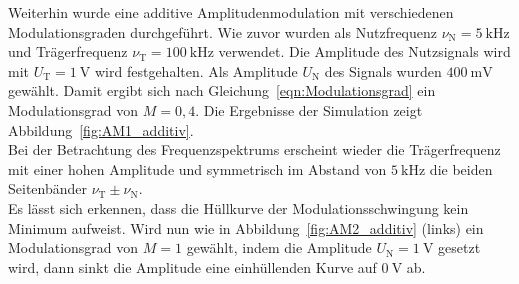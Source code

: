 \documentclass[a4paper,twoside,final]{article}
\begin{document}
Weiterhin wurde eine additive Amplitudenmodulation mit verschiedenen Modulationsgraden durchgeführt. Wie zuvor wurden als Nutzfrequenz $\nu_\text{N} = \SI{5}{\kilo\hertz}$ und Trägerfrequenz $\nu_\text{T} = \SI{100}{\kilo\hertz}$ verwendet. Die Amplitude des Nutzsignals wird mit $U_\text{T} = \SI{1}{\volt}$ wird festgehalten. Als Amplitude $U_\text{N}$ des Signals wurden $\SI{400}{\milli\volt}$ gewählt. Damit ergibt sich nach Gleichung~\eqref{eqn:Modulationsgrad} ein Modulationsgrad von $M = 0,4$. Die Ergebnisse der Simulation zeigt Abbildung~\ref{fig:AM1_additiv}.\\
Bei der Betrachtung des Frequenzspektrums erscheint wieder die Trägerfrequenz mit einer hohen Amplitude und symmetrisch im Abstand von $\SI{5}{\kilo\hertz}$ die beiden Seitenbänder $\nu_\text{T}\pm \nu_\text{N}$.\\
Es lässt sich erkennen, dass die Hüllkurve der Modulationsschwingung kein Minimum aufweist. Wird nun wie in Abbildung~\ref{fig:AM2_additiv} (links) ein Modulationsgrad von $M = 1$ gewählt, indem die Amplitude $U_\text{N} = \SI{1}{\volt}$ gesetzt wird, dann sinkt die Amplitude eine einhüllenden Kurve auf $\SI{0}{\volt}$ ab.
\end{document}
